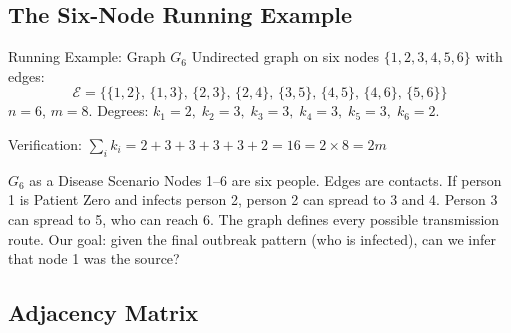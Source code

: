 \subsection{The Six-Node Running Example}

\begin{examplebox}{Running Example: Graph $G_6$}
\label{ex:g6}
Undirected graph on six nodes $\{1,2,3,4,5,6\}$ with edges:
\[
\mathcal{E} = \{\{1,2\},\, \{1,3\},\, \{2,3\},\, \{2,4\},\, \{3,5\},\, \{4,5\},\, \{4,6\},\, \{5,6\}\}
\]
$n=6$, $m=8$. Degrees: $k_1=2,\; k_2=3,\; k_3=3,\; k_4=3,\; k_5=3,\; k_6=2$.

\begin{center}
\end{center}

Verification: $\sum_i k_i = 2+3+3+3+3+2 = 16 = 2 \times 8 = 2m$ \checkmark
\end{examplebox}

\begin{analogybox}{$G_6$ as a Disease Scenario}
Nodes 1--6 are six people. Edges are contacts. If person 1 is Patient Zero and infects person 2, person 2 can spread to 3 and 4. Person 3 can spread to 5, who can reach 6. The graph defines every possible transmission route. Our goal: given the final outbreak pattern (who is infected), can we infer that node 1 was the source?
\end{analogybox}

\subsection{Adjacency Matrix}

